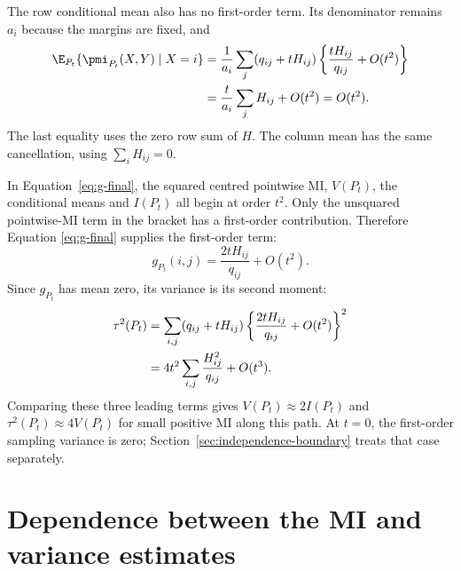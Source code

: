 The row conditional mean also has no first-order term. Its denominator
remains \(a_i\) because the margins are fixed, and
\begin{align*}
 \E_{P_t}\{\pmi_{P_t}(X,Y)\mid X=i\}
 &=\frac{1}{a_i}\sum_j(q_{ij}+tH_{ij})
   \left\{\frac{tH_{ij}}{q_{ij}}+O(t^2)\right\}\\*
 &=\frac{t}{a_i}\sum_jH_{ij}+O(t^2)
 =O(t^2).
\end{align*}
The last equality uses the zero row sum of \(H\). The column mean has the
same cancellation, using \(\sum_iH_{ij}=0\).

In Equation~\eqref{eq:g-final}, the squared centred pointwise MI,
\(V(P_t)\), the conditional means and \(I(P_t)\) all begin at order
\(t^2\). Only the unsquared pointwise-MI term in the bracket has a
first-order contribution. Therefore Equation
\eqref{eq:g-final} supplies the first-order term:
\begin{equation}
 g_{P_t}(i,j)=\frac{2tH_{ij}}{q_{ij}}+O(t^2).
\end{equation}
Since \(g_{P_t}\) has mean zero, its variance is its second moment:
\begin{align}
 \tau^2(P_t)
 &=\sum_{i,j}(q_{ij}+tH_{ij})
   \left\{\frac{2tH_{ij}}{q_{ij}}+O(t^2)\right\}^2\notag\\*
 &=4t^2\sum_{i,j}\frac{H_{ij}^2}{q_{ij}}+O(t^3).
\end{align}
Comparing these three leading terms gives \(V(P_t)\approx2I(P_t)\) and
\(\tau^2(P_t)\approx4V(P_t)\) for small positive MI along this path.
At \(t=0\), the first-order sampling variance is zero;
Section~\ref{sec:independence-boundary} treats that case separately.

\section{Dependence between the MI and variance estimates}
\label{sec:mi-variance-covariance}

